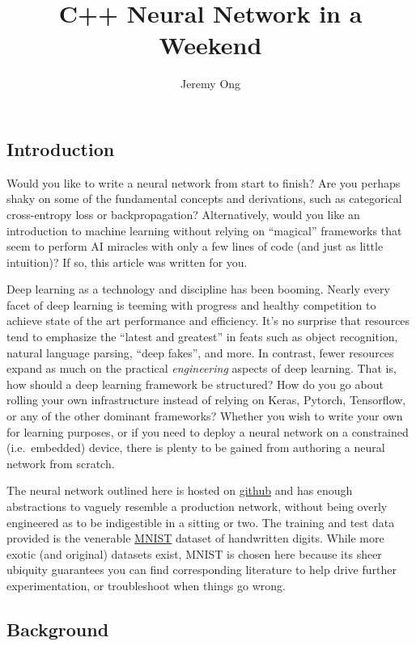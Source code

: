 \documentclass[
]{article}
\title{C++ Neural Network in a Weekend}
\author{Jeremy Ong}
\date{}
\begin{document}
\maketitle

\hypertarget{introduction}{%
\subsection{Introduction}\label{introduction}}

Would you like to write a neural network from start to finish? Are you
perhaps shaky on some of the fundamental concepts and derivations, such
as categorical cross-entropy loss or backpropagation? Alternatively,
would you like an introduction to machine learning without relying on
``magical'' frameworks that seem to perform AI miracles with only a few
lines of code (and just as little intuition)? If so, this article was
written for you.

Deep learning as a technology and discipline has been booming. Nearly
every facet of deep learning is teeming with progress and healthy
competition to achieve state of the art performance and efficiency. It's
no surprise that resources tend to emphasize the ``latest and greatest''
in feats such as object recognition, natural language parsing, ``deep
fakes'', and more. In contrast, fewer resources expand as much on the
practical \emph{engineering} aspects of deep learning. That is, how
should a deep learning framework be structured? How do you go about
rolling your own infrastructure instead of relying on Keras, Pytorch,
Tensorflow, or any of the other dominant frameworks? Whether you wish to
write your own for learning purposes, or if you need to deploy a neural
network on a constrained (i.e.~embedded) device, there is plenty to be
gained from authoring a neural network from scratch.

The neural network outlined here is hosted on
\href{https://github.com/jeremyong/cpp_nn_in_a_weekend}{github} and has
enough abstractions to vaguely resemble a production network, without
being overly engineered as to be indigestible in a sitting or two. The
training and test data provided is the venerable
\href{http://yann.lecun.com/exdb/mnist/}{MNIST} dataset of handwritten
digits. While more exotic (and original) datasets exist, MNIST is chosen
here because its sheer ubiquity guarantees you can find corresponding
literature to help drive further experimentation, or troubleshoot when
things go wrong.

\hypertarget{background}{%
\subsection{Background}\label{background}}
\end{document}
